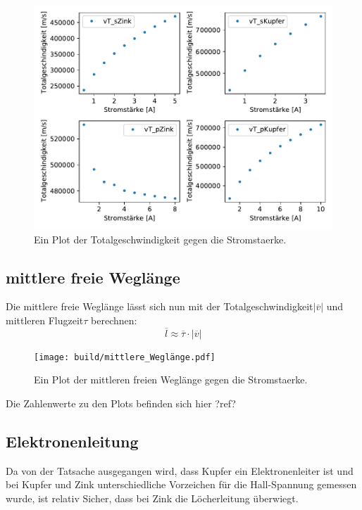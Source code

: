     \begin{figure}[H]
        \centering
        \includegraphics[width=1.1\textwidth]{build/Totalgeschwindigkeit.pdf}
        \caption{Ein Plot der Totalgeschwindigkeit gegen die Stromstaerke.}
        \label{img:vT}
    \end{figure}


    \subsection{mittlere freie Weglänge}


    Die mittlere freie Weglänge lässt sich nun mit der Totalgeschwindigkeit$|\overline{v}|$ und mittleren Flugzeit$\tau$ berechnen:
    \begin{equation}
        \overline{l} \approx \overline{\tau} \cdot |\overline{v}| \nonumber
    \end{equation}

    
    \begin{figure}[H]
        \centering
        \texttt{[image: build/mittlere\_Weglänge.pdf]}
        \caption{Ein Plot der mittleren freien Weglänge gegen die Stromstaerke.}
        \label{img:mfl}
    \end{figure}
    Die Zahlenwerte zu den Plots befinden sich hier ?ref?

    \subsection{Elektronenleitung}
    Da von der Tatsache ausgegangen wird, dass Kupfer ein Elektronenleiter ist und bei Kupfer und Zink unterschiedliche Vorzeichen für
    die Hall-Spannung gemessen wurde, ist relativ Sicher, dass bei Zink die Löcherleitung überwiegt.





















